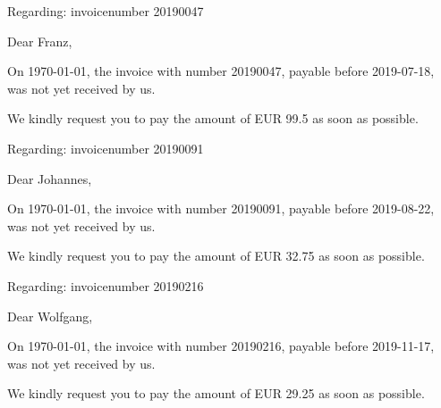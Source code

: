 \documentclass[a4paper]{article}
\begin{document}
\begin{flushright}
Regarding: invoicenumber 20190047
\end{flushright}

\vspace{3cm}

Dear Franz,

\vspace{2cm}

On \today, the invoice with number 20190047, payable before
2019-07-18, was not yet received by us.

\vspace{5mm}

We kindly request you to pay the amount of EUR 99.5
as soon as possible.

\newpage

\begin{flushright}
Regarding: invoicenumber 20190091
\end{flushright}

\vspace{3cm}

Dear Johannes,

\vspace{2cm}

On \today, the invoice with number 20190091, payable before
2019-08-22, was not yet received by us.

\vspace{5mm}

We kindly request you to pay the amount of EUR 32.75
as soon as possible.

\newpage

\begin{flushright}
Regarding: invoicenumber 20190216
\end{flushright}

\vspace{3cm}

Dear Wolfgang,

\vspace{2cm}

On \today, the invoice with number 20190216, payable before
2019-11-17, was not yet received by us.

\vspace{5mm}

We kindly request you to pay the amount of EUR 29.25
as soon as possible.

\newpage
\end{document}
